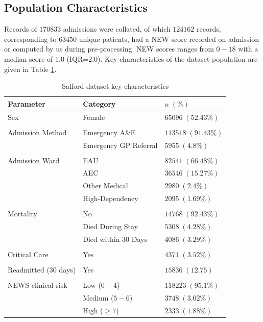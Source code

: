 \documentclass[10pt,journal, compsoc]{IEEEtran}
\begin{document}
\subsection{Population Characteristics} Records of $170833$ admissions were collated, of which $124162$ records, corresponding to $63450$ unique patients, had a NEW score recorded on-admission or computed by us during pre-processing. NEW scores ranges from $0-18$ with a median score of $1.0$ (IQR=$2.0$). Key characteristics of the dataset population are given in Table \ref{tab:population}.

\begin{table}[!t]
    \renewcommand{\arraystretch}{1.3}
    \centering
    \caption{Salford dataset key characteristics}
    \label{tab:population}
    \begin{tabular}{l l l}
        \toprule
        Parameter            & Category              & $n\;(\%)$           \\
        \midrule
        Sex                  & Female                & $65096\;(52.43\%)$  \\\\
        Admission Method     & Emergency A\&E        & $113518\;(91.43\%)$ \\
                             & Emergency GP Referral & $5955\;(4.8\%)$     \\\\
        Admission Ward       & EAU                   & $82541\;(66.48\%)$  \\
                             & AEC                   & $36546\;(15.27\%)$  \\
                             & Other Medical         & $2980\;(2.4\%)$     \\
                             & High-Dependency       & $2095\;(1.69\%)$    \\\\
        Mortality            & No                    & $14768\;(92.43\%)$  \\
                             & Died During Stay      & $5308\;(4.28\%)$    \\
                             & Died within 30 Days   & $4086\;(3.29\%)$    \\\\
        Critical Care        & Yes                   & $4371\;(3.52\%)$    \\\\
        Readmitted (30 days) & Yes                   & $15836\;(12.75)$    \\\\
        NEWS clinical risk   & Low ($0-4$)           & $118223\;(95.1\%)$  \\
                             & Medium ($5-6$)        & $3748\;(3.02\%)$    \\
                             & High ($\geq 7$)       & $2333\;(1.88\%)$    \\
        \bottomrule
    \end{tabular}
\end{table}
\end{document}
